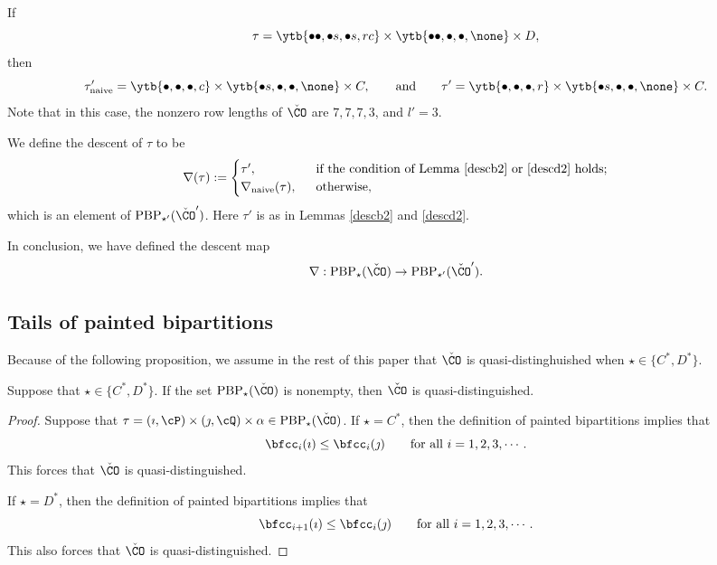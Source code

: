 \documentclass[ssunip]{subfiles}
\begin{document}
\begin{Example}
 If 
 \[
 \tau= \ytb{\bullet\bullet, \bullet s, \bullet s, r c} \times \ytb{\bullet\bullet,\bullet,\bullet, \none }\times 
  D,
 \]
 then 
\[
 \tau'_{\mathrm{naive}}=\ytb{\bullet, \bullet , \bullet ,  c} \times \ytb{\bullet s,\bullet,\bullet, \none } \times 
  C,\qquad\textrm{and}\qquad \tau'=\ytb{\bullet, \bullet , \bullet ,  r} \times \ytb{\bullet s,\bullet,\bullet, \none } \times
  C.
 \]
 Note that in this case, the nonzero row lengths of $\check \CO$ are $7,7,7,3$,   and $l'=3$.
\end{Example}

\begin{defn}
We define the descent of $\tau$ to be 
\[
  \nabla(\tau):= \begin{cases}
  \tau', & \ \text{ if the condition of Lemma \ref{descb2}  or \ref{descd2} holds}; \\
  \nabla_{\mathrm{naive}}( \tau), & \ \text{ otherwise},
\end{cases}
\]
which is an element of $  \mathrm{PBP}_{\star'}(\check \CO')$. 
Here $\tau'$ is as in Lemmas  \ref{descb2} and \ref{descd2}. 
\end{defn}
In conclusion, we have defined the descent map
\[
\nabla: \mathrm{PBP}_{\star}(\check \CO)\rightarrow \mathrm{PBP}_{\star'}(\check \CO').
\]


\subsection{Tails of painted bipartitions}
Because of the following proposition, we assume in the rest of this paper that $\check \CO$ is quasi-distinghuished  when $\star\in \{C^*, D^*\}$. 
 

\begin{prop}
  Suppose that $\star\in \{C^*, D^*\}$. If the set $\mathrm{PBP}_\star(\check \CO)$ is nonempty, then $\check \CO$ is quasi-distinguished.  
\end{prop}
\begin{proof}
  Suppose that $\tau=(\imath,\cP)\times(\jmath,\cQ)\times \alpha \in  \mathrm{PBP}_\star(\check \CO)$. If  $\star=C^*$, then  the definition of painted bipartitions implies that 
 \[
 \bfcc_i(\imath)\leq \bfcc_i(\jmath) \qquad \textrm{for all } i=1,2,3, \cdots.
 \]
This forces that $\check \CO$ is quasi-distinguished. 
 
 If  $\star=D^*$, then  the definition of painted bipartitions implies that 
 \[
 \bfcc_{i+1}(\imath)\leq \bfcc_i(\jmath) \qquad \textrm{for all } i=1,2,3, \cdots.
 \]
This  also forces that   $\check \CO$ is quasi-distinguished.
 \end{proof}
\end{document}

